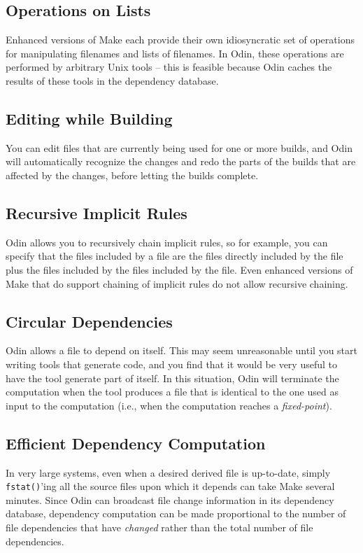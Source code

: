 \documentclass[hidelinks]{report}
\newcommand{\ex}{\tt}   %
\begin{document}
\subsection{Operations on Lists}
Enhanced versions of Make each provide their own idiosyncratic
set of operations for manipulating filenames and lists of filenames.
In Odin, these operations are performed by arbitrary Unix tools --
this is feasible because Odin caches the results of these tools in
the dependency database.

\subsection{Editing while Building}
You can edit files that are currently being used for one or more builds,
and Odin will automatically recognize the changes and redo the parts of
the builds that are affected by the changes,
before letting the builds complete.

\subsection{Recursive Implicit Rules}
Odin allows you to recursively chain implicit rules,
so for example, you can specify that the files included by
a file are the files directly included by the file
plus the files included by the files included by the file.
Even enhanced versions of Make that do support chaining
of implicit rules do not allow recursive chaining.

\subsection{Circular Dependencies}
Odin allows a file to depend on itself.
This may seem unreasonable until you start writing tools that generate code,
and you find that it would be very useful to have the tool generate part
of itself.
In this situation,
Odin will terminate the computation when the tool produces a file that
is identical to the one used as input to the computation
(i.e., when the computation reaches a {\em fixed-point}).

\subsection{Efficient Dependency Computation}
In very large systems, even when a desired derived file is up-to-date,
simply {\ex fstat()}'ing all the source files upon which it depends
can take Make several minutes.
Since Odin can broadcast file change information in its
dependency database,
dependency computation can be made proportional to the number of
file dependencies that have {\em changed} rather than the total number
of file dependencies.
\end{document}
